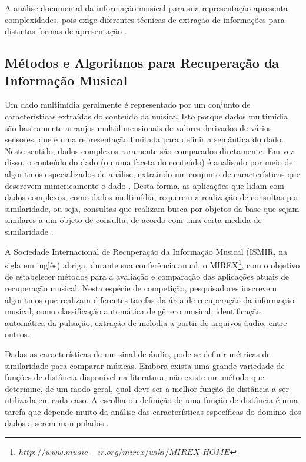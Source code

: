 A análise documental da informação musical para sua representação apresenta complexidades, pois exige diferentes técnicas de extração de informações para distintas formas de apresentação \cite{downie2003}.

\subsection{Métodos e Algoritmos para Recuperação da Informação Musical}

Um dado multimídia geralmente é representado por um conjunto de características extraídas do conteúdo da música. Isto porque dados multimídia são basicamente arranjos multidimensionais de valores derivados de vários sensores, que é uma representação limitada para definir a semântica do dado. Neste sentido, dados complexos raramente são comparados diretamente. Em vez disso, o conteúdo do dado (ou uma faceta do conteúdo) é analisado por meio de algoritmos especializados de análise, extraindo um conjunto de características que descrevem numericamente o dado \cite{kaster2012}. Desta forma, as aplicações que lidam com dados complexos, como dados multimídia, requerem a realização de consultas por similaridade, ou seja, consultas que realizam busca por objetos da base que sejam similares a um objeto de consulta, de acordo com uma certa medida de similaridade \cite{barioni2006}.

A Sociedade Internacional de Recuperação da Informação Musical (ISMIR, na sigla em inglês) abriga, durante sua conferência anual, o MIREX\footnote{$http://www.music-ir.org/mirex/wiki/MIREX\_HOME$}, com o objetivo de estabelecer métodos para a avaliação e comparação das aplicações atuais de recuperação musical. Nesta espécie de competição, pesquisadores inscrevem algoritmos que realizam diferentes tarefas da área de recuperação da informação musical, como classificação automática de gênero musical, identificação automática da pulsação, extração de melodia a partir de arquivos áudio, entre outros.

Dadas as características de um sinal de áudio, pode-se definir métricas de similaridade para comparar músicas. Embora exista uma grande variedade de funções de distância disponível na literatura, não existe um método que determine, de um modo geral, qual deve ser a melhor função de distância a ser utilizada em cada caso. A escolha ou definição de uma função de distância é uma tarefa que depende muito da análise das características específicas do domínio dos dados a serem manipulados \cite{barioni2006}.

